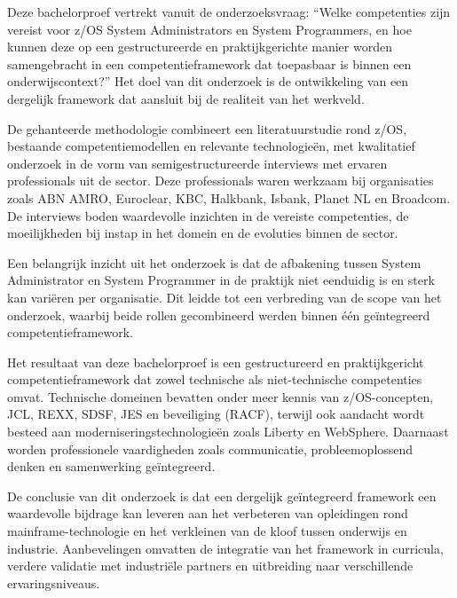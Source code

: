 Deze bachelorproef vertrekt vanuit de onderzoeksvraag: “Welke competenties zijn vereist voor z/OS System Administrators en System Programmers, en hoe kunnen deze op een gestructureerde en praktijkgerichte manier worden samengebracht in een competentieframework dat toepasbaar is binnen een onderwijscontext?” Het doel van dit onderzoek is de ontwikkeling van een dergelijk framework dat aansluit bij de realiteit van het werkveld.

De gehanteerde methodologie combineert een literatuurstudie rond z/OS, bestaande competentiemodellen en relevante technologieën, met kwalitatief onderzoek in de vorm van semigestructureerde interviews met ervaren professionals uit de sector. Deze professionals waren werkzaam bij organisaties zoals ABN AMRO, Euroclear, KBC, Halkbank, Isbank, Planet NL en Broadcom. De interviews boden waardevolle inzichten in de vereiste competenties, de moeilijkheden bij instap in het domein en de evoluties binnen de sector.

Een belangrijk inzicht uit het onderzoek is dat de afbakening tussen System Administrator en System Programmer in de praktijk niet eenduidig is en sterk kan variëren per organisatie. Dit leidde tot een verbreding van de scope van het onderzoek, waarbij beide rollen gecombineerd werden binnen één geïntegreerd competentieframework.

Het resultaat van deze bachelorproef is een gestructureerd en praktijkgericht competentieframework dat zowel technische als niet-technische competenties omvat. Technische domeinen bevatten onder meer kennis van z/OS-concepten, JCL, REXX, SDSF, JES en beveiliging (RACF), terwijl ook aandacht wordt besteed aan moderniseringstechnologieën zoals Liberty en WebSphere. Daarnaast worden professionele vaardigheden zoals communicatie, probleemoplossend denken en samenwerking geïntegreerd.

De conclusie van dit onderzoek is dat een dergelijk geïntegreerd framework een waardevolle bijdrage kan leveren aan het verbeteren van opleidingen rond mainframe-technologie en het verkleinen van de kloof tussen onderwijs en industrie. Aanbevelingen omvatten de integratie van het framework in curricula, verdere validatie met industriële partners en uitbreiding naar verschillende ervaringsniveaus.
